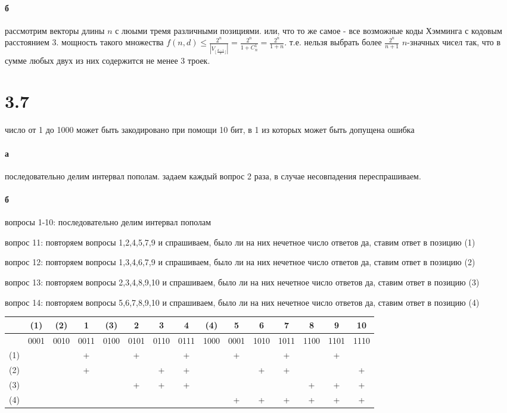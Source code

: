 \documentclass[russian]{article}
\begin{document}
\paragraph{б} 

рассмотрим векторы длины $n$ с люыми тремя различными позициями. или, что то же самое - все возможные коды Хэмминга с кодовым расстоянием 3. мощность такого множества $f(n,d)\le\frac{2^n}{|V_{\lfloor \frac{d-1}{2} \rfloor}|} = \frac{2^n}{1+C_n^1}=\frac{2^n}{1+n}$. т.е. нельзя выбрать более $\frac{2^n}{n+1}$ $n$-значных чисел так, что в сумме любых двух из них содержится не менее  3 троек.

\section*{3.7}

число от 1 до 1000 может быть закодировано при помощи 10 бит, в 1 из которых может быть допущена ошибка

\paragraph{а}
последовательно делим интервал пополам. задаем каждый вопрос 2 раза, в случае несовпадения переспрашиваем.

\paragraph{б}

вопросы 1-10: последовательно делим интервал пополам

вопрос 11: повторяем вопросы 1,2,4,5,7,9 и спрашиваем, было ли на них нечетное число ответов да, ставим ответ в позицию (1)

вопрос 12: повторяем вопросы 1,3,4,6,7,9 и спрашиваем, было ли на них нечетное число ответов да, ставим ответ в позицию (2)

вопрос 13: повторяем вопросы 2,3,4,8,9,10 и спрашиваем, было ли на них нечетное число ответов да, ставим ответ в позицию (3)

вопрос 14: повторяем вопросы 5,6,7,8,9,10 и спрашиваем, было ли на них нечетное число ответов да, ставим ответ в позицию (4)

{
\tiny
\begin{tabular}{|c|c|c|c|c|c|c|c|c|c|c|c|c|c|c|} \hline
& (1) & (2) & 1 & (3) & 2 & 3 & 4 & (4) & 5 & 6 & 7 & 8 & 9 & 10 \\\hline
& 0001 & 0010 & 0011 & 0100 & 0101 & 0110 & 0111 & 1000 & 0001 & 1010 & 1011 & 1100 & 1101 & 1110 \\\hline
(1) & & & + & & + &   & + & & + &   & + &   & + &   \\\hline
(2) & & & + & &   & + & + & &   & + & + &   &   & + \\\hline
(3) & & &   & & + & + & + & &   &   &   & + & + & + \\\hline
(4) & & &   & &   &   &   & & + & + & + & + & + & + \\\hline
\end{tabular}
}
\end{document}
